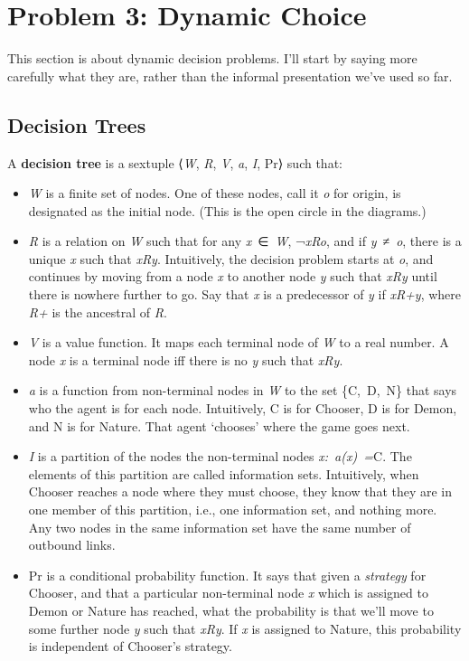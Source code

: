 \documentclass[
  11pt,
  letterpaper,
  DIV=11,
  numbers=noendperiod,
  twoside]{scrartcl}
\providecommand{\tightlist}{%
  \setlength{\itemsep}{0pt}\setlength{\parskip}{0pt}}\usepackage{longtable,booktabs,array}
\begin{document}
\section{Problem 3: Dynamic Choice}\label{sec-dual-mandate}

This section is about dynamic decision problems. I'll start by saying
more carefully what they are, rather than the informal presentation
we've used so far.

\subsection{Decision Trees}\label{sec-decision-tree}

A \textbf{decision tree} is a sextuple ⟨\emph{W}, \emph{R}, \emph{V},
\emph{a}, \emph{I}, Pr⟩ such that:

\begin{itemize}
\tightlist
\item
  \emph{W} is a finite set of nodes. One of these nodes, call it
  \emph{o} for origin, is designated as the initial node. (This is the
  open circle in the diagrams.)
\item
  \emph{R} is a relation on \emph{W} such that for any
  \emph{x}~∈~\emph{W}, ¬\emph{xRo}, and if \emph{y}~≠~\emph{o}, there is
  a unique \emph{x} such that \emph{xRy}. Intuitively, the decision
  problem starts at \emph{o}, and continues by moving from a node
  \emph{x} to another node \emph{y} such that \emph{xRy} until there is
  nowhere further to go. Say that \emph{x} is a predecessor of \emph{y}
  if \emph{xR+y}, where \emph{R+} is the ancestral of \emph{R}.
\item
  \emph{V} is a value function. It maps each terminal node of \emph{W}
  to a real number. A node \emph{x} is a terminal node iff there is no
  \emph{y} such that \emph{xRy}.
\item
  \emph{a} is a function from non-terminal nodes in \emph{W} to the set
  \{C,~D,~N\} that says who the agent is for each node. Intuitively, C
  is for Chooser, D is for Demon, and N is for Nature. That agent
  `chooses' where the game goes next.
\item
  \emph{I} is a partition of the nodes the non-terminal nodes
  \emph{x:~a(x)~=}C. The elements of this partition are called
  information sets. Intuitively, when Chooser reaches a node where they
  must choose, they know that they are in one member of this partition,
  i.e., one information set, and nothing more. Any two nodes in the same
  information set have the same number of outbound links.
\item
  Pr is a conditional probability function. It says that given a
  \emph{strategy} for Chooser, and that a particular non-terminal node
  \emph{x} which is assigned to Demon or Nature has reached, what the
  probability is that we'll move to some further node \emph{y} such that
  \emph{xRy}. If \emph{x} is assigned to Nature, this probability is
  independent of Chooser's strategy.
\end{itemize}
\end{document}
